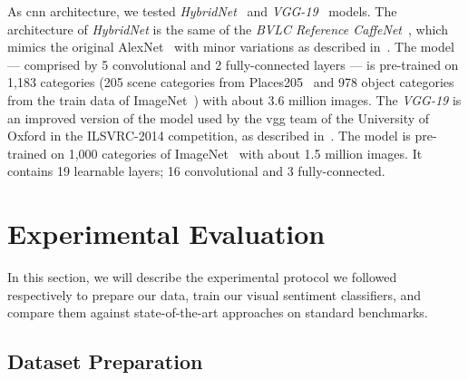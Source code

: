 As \gls{cnn} architecture, we tested \emph{HybridNet}~\cite{zhou2014learning} and \emph{VGG-19}~\cite{simonyan2014very} models.
The architecture of \emph{HybridNet} is the same of the \emph{BVLC Reference CaffeNet}~\cite{jia2014caffe}, which mimics the original AlexNet~\cite{krizhevsky2012imagenet} with minor variations as described in~\cite{zhou2014learning}.
The model --- comprised by 5 convolutional and 2 fully-connected layers --- is pre-trained on 1,183 categories (205 scene categories from Places205~\cite{zhou2014learning} and 978 object categories from the train data of ImageNet~\cite{russakovsky2015imagenet}) with about 3.6 million images.
The \emph{VGG-19} is an improved version of the model used by the \gls{vgg} team of the University of Oxford in the ILSVRC-2014 competition, as described in~\cite{simonyan2014very}.
The model is pre-trained on 1,000 categories of ImageNet~\cite{russakovsky2015imagenet} with about 1.5 million images.
It contains 19 learnable layers; 16 convolutional and 3 fully-connected.

\section{Experimental Evaluation}
\label{sec:vsa:experiments}

In this section, we will describe the experimental protocol we followed respectively to prepare our data, train our visual sentiment classifiers, and compare them against state-of-the-art approaches on standard benchmarks.

\subsection{Dataset Preparation}

